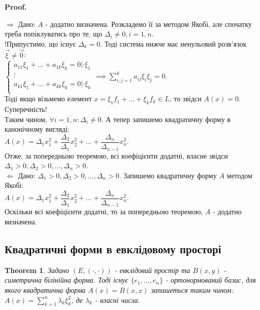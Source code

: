 \documentclass[a4paper, 10pt]{article}
\makeatletter
\def\huge{\displaystyle}
\def\qed{$\blacksquare$}
\def\rightproof{$\boxed{\Rightarrow}$ }
\def\leftproof{$\boxed{\Leftarrow}$ }
\theoremstyle{theoremdd}
\newtheorem{theorem}{Theorem}[subsection]
\theoremstyle{theoremdd}
\theoremstyle{theoremdd}
\theoremstyle{theoremdd}
\theoremstyle{theoremdd}
\theoremstyle{theoremdd}
\theoremstyle{theoremdd}
\theoremstyle{theoremdd}
\renewenvironment{proof}[1][Proof.\\]{\par
\pushQED{\hfill \qed}%
\normalfont \topsep6\p@\@plus6\p@\relax
\trivlist
\item\relax
{\bfseries
#1\@addpunct{.}}\hspace\labelsep\ignorespaces
}{%
\popQED\endtrivlist\@endpefalse
}
\makeatother
\begin{document}
\begin{proof}
\rightproof Дано: $A$ - додатно визначена. Розкладемо її за методом Якобі, але спочатку треба попіклуватись про те, що $\Delta_i \neq 0, i = \overline{1,n}$.\\
!Припустимо, що існує $\Delta_k = 0$. Тоді система нижче має ненульовий розв'язок $\vec{\xi} \neq \vec{0}$:\\
$\begin{cases}
a_{11}\xi_1 + \dots + a_{1k}\xi_k = 0 | \cdot \xi_1 \\
\vdots \\
a_{k1}\xi_1 + \dots + a_{kk}\xi_k = 0 | \cdot \xi_k \\
\end{cases} \implies \huge\sum_{i,j=1}^k a_{ij}\xi_i \xi_j = 0$.\\
Тоді якщо візьмемо елемент $x = \xi_1 f_1 + \dots + \xi_k f_k \in L$, то звідси $A(x) = 0$. Суперечність!\\
Таким чином, $\forall i=\overline{1,n}: \Delta_i \neq 0$. А тепер запишемо квадратичну форму в канонічному вигляді:\\
$A(x) = \Delta_1 x_1^2 + \dfrac{\Delta_2}{\Delta_1} x_2^2 + \dots + \dfrac{\Delta_n}{\Delta_{n-1}} x_n^2$.\\
Отже, за попередньою теоремою, всі коефіцієнти додатні, власне звідси $\Delta_1>0,\Delta_2>0,\dots,\Delta_n>0$.
\bigskip \\
\leftproof Дано: $\Delta_1>0,\Delta_2>0,\dots,\Delta_n>0$. Запишемо квадратичну форму $A$ методом Якобі:\\
$A(x) = \Delta_1 x_1^2 + \dfrac{\Delta_2}{\Delta_1} x_2^2 + \dots + \dfrac{\Delta_n}{\Delta_{n-1}} x_n^2$.\\
Оскільки всі коефіцієнти додатні, то за попередньою теоремою, $A$ - додатно визначена.
\end{proof}

\subsection{Квадратичні форми в евклідовому просторі}
\begin{theorem}
Задано $(E,(\cdot,\cdot))$ - евклідовий простір та $B(x,y)$ - симетрична білінійна форма. Тоді існує $\{e_1,\dots,e_n\}$ - ортонормований базис, для якого квадратична форма $A(x) = B(x,x)$ запишеться таким чином:\\
$A(x) = \huge\sum_{k=1}^n \lambda_k \xi_k^2$, де $\lambda_k$ - власні числа.
\end{theorem}
\end{document}
